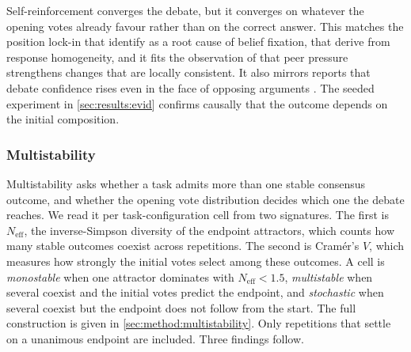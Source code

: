 Self-reinforcement converges the debate, but it converges on whatever the opening votes
already favour rather than on the correct answer. This matches the position lock-in
that \citet{oh2026entrenchment} identify as a root cause of belief fixation, that
\citet{estornell2024multillm} derive from response homogeneity, and it fits the
observation of \citet{cau2026agreementdrift} that peer pressure strengthens changes
that are locally consistent. It also mirrors reports that debate confidence rises
even in the face of opposing arguments \citep{prasad2025certain}. The seeded experiment in
\autoref{sec:results:evid} confirms causally that the outcome depends on the
initial composition.

\subsubsection{Multistability}
\label{sec:results:multistability}

Multistability asks whether a task admits more than one stable consensus outcome, and
whether the opening vote distribution decides which one the debate reaches. We read
it per task-configuration cell from two signatures. The first is $N_{\mathrm{eff}}$,
the inverse-Simpson diversity of the endpoint attractors, which counts how many stable
outcomes coexist across repetitions. The second is Cramér's $V$, which measures how
strongly the initial votes select among these outcomes. A cell is \emph{monostable}
when one attractor dominates with $N_{\mathrm{eff}} < 1.5$, \emph{multistable} when
several coexist and the initial votes predict the endpoint, and \emph{stochastic}
when several coexist but the endpoint does not follow from the start. The full
construction is given in \autoref{sec:method:multistability}. Only repetitions that
settle on a unanimous endpoint are included. Three findings follow.

